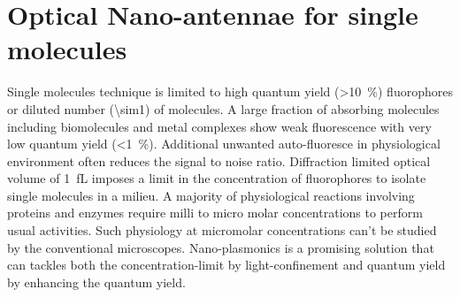 \section{Optical Nano-antennae for single molecules}
Single molecules technique is limited to high quantum yield (\SI{>10}{\percent}) fluorophores or diluted number (\SI{\sim1}{\nM}) of molecules.
A large fraction of absorbing molecules including biomolecules and metal complexes show weak fluorescence with very low quantum yield (\SI{<1}{\percent}).
Additional unwanted auto-fluoresce in physiological environment often reduces the signal to noise ratio.
Diffraction limited optical volume of \SI{1}{fL} imposes a limit in the concentration of fluorophores to isolate single molecules in a milieu.
A majority of physiological reactions involving proteins and enzymes require milli to micro molar concentrations to perform usual activities.\cite{craighead2006future,punj2013gold,fabrizio2016roadmap,punj2014thesis}
Such physiology at micromolar concentrations can't be studied by the conventional microscopes.
Nano-plasmonics is a promising solution that can tackles both the concentration-limit by light-confinement and quantum yield by enhancing the quantum yield.

